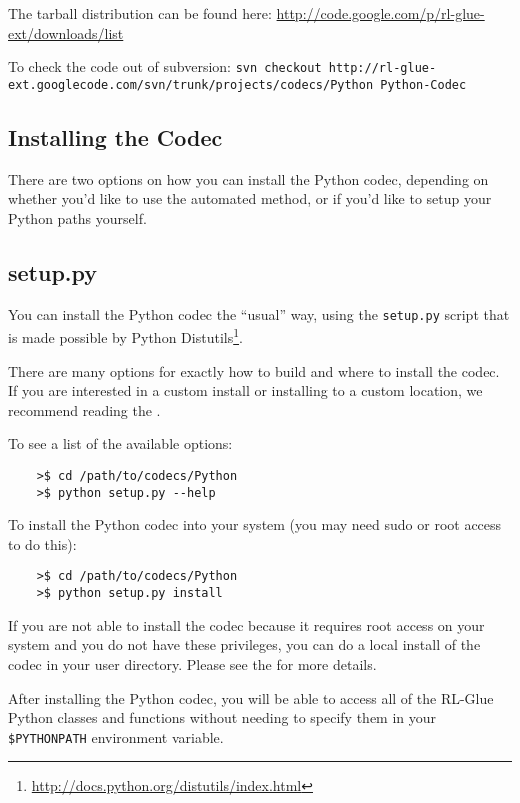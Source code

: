 \documentclass[11pt]{article}
\begin{document}
The tarball distribution can be found here:\newline
\url{http://code.google.com/p/rl-glue-ext/downloads/list}


To check the code out of subversion:\newline
\small \texttt{svn checkout http://rl-glue-ext.googlecode.com/svn/trunk/projects/codecs/Python Python-Codec} \normalsize

\subsection{Installing the Codec}
There are two options on how you can install the Python codec, depending on whether you'd like to use the automated method, or if you'd like to setup your Python paths yourself.

\subsection{setup.py}
You can install the Python codec the ``usual'' way, using the \texttt{setup.py} script that is made possible by Python Distutils\footnote{\url{http://docs.python.org/distutils/index.html}}.

There are many options for exactly how to build and where to install the codec.  If you are interested in a custom install or installing to a custom location, we recommend reading the .

To see a list of the available options:
\begin{verbatim}
	>$ cd /path/to/codecs/Python
	>$ python setup.py --help
\end{verbatim}

To install the Python codec into your system (you may need sudo or root access to do this):
\begin{verbatim}
	>$ cd /path/to/codecs/Python
	>$ python setup.py install
\end{verbatim}

If you are not able to install the codec because it requires root access on your system and you do not have these privileges, you can do a local install of the codec in your user directory.  Please see the   for more details.

After installing the Python codec, you will be able to access all of the RL-Glue Python classes and functions without needing to specify them in your 
\texttt{\$PYTHONPATH} environment variable.
\end{document}
